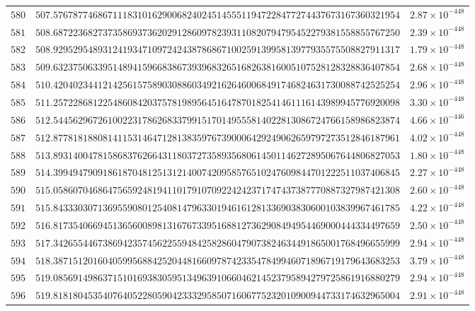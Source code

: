 \documentclass[12pt,reqno]{amsart}
\theoremstyle{remark}
\begin{document}
\begin{longtable}{clc}
$580$ & $507.5767877468671118310162900682402451455511947228477274437673167360321954$ & $2.87\times 10^{-448}$ \\
$581$ & $508.6872236827373586937362029128609782393110820794795452279381558855767250$ & $2.39\times 10^{-448}$ \\
$582$ & $508.9295295489312419347109724243878686710025913995813977935575508827911317$ & $1.79\times 10^{-448}$ \\
$583$ & $509.6323750633951489415966838673939683265168263816005107528128328836407854$ & $2.68\times 10^{-448}$ \\
$584$ & $510.4204023441214256157589030886034921626460068491746824631730088742525254$ & $2.96\times 10^{-448}$ \\
$585$ & $511.2572286812254860842037578198956451647870182541461116143989945776920098$ & $3.30\times 10^{-448}$ \\
$586$ & $512.5445629672610022317862683379915170149555814022813086724766158986823874$ & $4.66\times 10^{-446}$ \\
$587$ & $512.8778181880814115314647128138359767390006429249062659797273512846187961$ & $4.02\times 10^{-448}$ \\
$588$ & $513.8931400478158683762664311803727358935680614501146272895067644806827053$ & $1.80\times 10^{-448}$ \\
$589$ & $514.3994947909186187048125131214007420958576510247609844701222511037406845$ & $2.27\times 10^{-448}$ \\
$590$ & $515.0586070468647565924819411017910709224242371747437387770887327987421308$ & $2.60\times 10^{-448}$ \\
$591$ & $515.8433303071369559080125408147963301946161281336903830600103839967461785$ & $4.22\times 10^{-448}$ \\
$592$ & $516.8173540669451365600898131676733951688127362908494954469000444334497659$ & $2.50\times 10^{-448}$ \\
$593$ & $517.3426554467386942357456225594842582860479073824634491865001768496655999$ & $2.94\times 10^{-448}$ \\
$594$ & $518.3871512016040599568842520448166097874233547849946071896719179643683253$ & $3.79\times 10^{-448}$ \\
$595$ & $519.0856914986371510169383059513496391066046214523795894279725861916880279$ & $2.94\times 10^{-448}$ \\
$596$ & $519.8181804535407640522805904233329585071606775232010900944733174632965004$ & $2.91\times 10^{-448}$ \\

\end{longtable}
\end{document}
